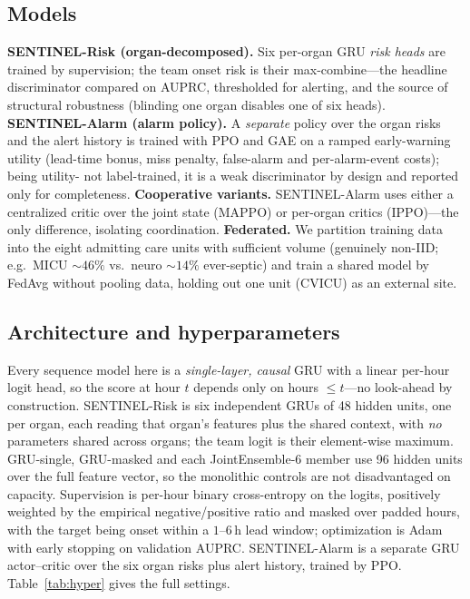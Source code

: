 \documentclass[conference]{IEEEtran}
\begin{document}
\subsection{Models}
\textbf{SENTINEL-Risk (organ-decomposed).} Six per-organ GRU \emph{risk heads} are
trained by supervision; the team onset risk is their max-combine---the headline
discriminator compared on AUPRC, thresholded for alerting, and the source of
structural robustness (blinding one organ disables one of six heads).
\textbf{SENTINEL-Alarm (alarm policy).} A \emph{separate} policy over the organ risks
and the alert history is trained with PPO \cite{schulman2017ppo} and GAE
\cite{schulman2016gae} on a ramped early-warning utility (lead-time bonus, miss
penalty, false-alarm and per-alarm-event costs); being utility- not label-trained, it
is a weak discriminator by design and reported only for completeness.
\textbf{Cooperative variants.} SENTINEL-Alarm uses either a centralized critic over
the joint state (MAPPO) or per-organ critics (IPPO)---the only difference, isolating
coordination. \textbf{Federated.} We partition training data into the eight admitting
care units with sufficient volume (genuinely non-IID; e.g.\ MICU ${\sim}46\%$ vs.\ neuro
${\sim}14\%$ ever-septic) and train a shared model by FedAvg \cite{mcmahan2017fedavg}
without pooling data, holding out one unit (CVICU) as an external site.

\subsection{Architecture and hyperparameters}
\label{subsec:hyper}
Every sequence model here is a \emph{single-layer, causal} GRU with a linear
per-hour logit head, so the score at hour $t$ depends only on hours $\leq t$---no
look-ahead by construction. SENTINEL-Risk is six independent GRUs of 48 hidden
units, one per organ, each reading that organ's features plus the shared context,
with \emph{no} parameters shared across organs; the team logit is their
element-wise maximum. GRU-single, GRU-masked and each JointEnsemble-6 member use
96 hidden units over the full feature vector, so the monolithic controls are not
disadvantaged on capacity. Supervision is per-hour binary cross-entropy on the
logits, positively weighted by the empirical negative/positive ratio and masked
over padded hours, with the target being onset within a $1$--$6$\,h lead window;
optimization is Adam with early stopping on validation AUPRC. SENTINEL-Alarm is a
separate GRU actor--critic over the six organ risks plus alert history, trained by
PPO. Table~\ref{tab:hyper} gives the full settings.
\end{document}
